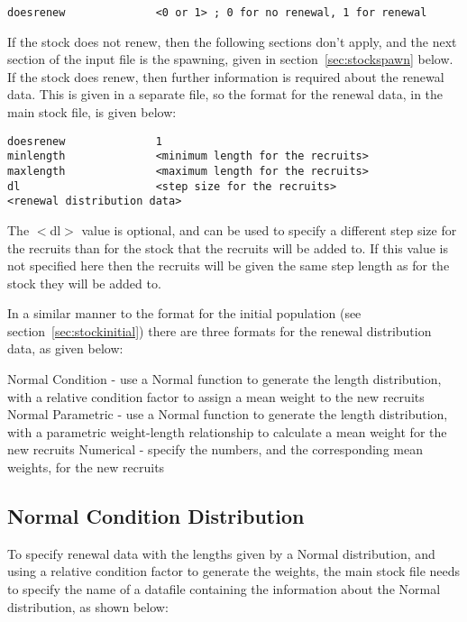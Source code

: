 \documentclass[10pt,twoside]{book}
\begin{document}
{\small\begin{verbatim}
doesrenew              <0 or 1> ; 0 for no renewal, 1 for renewal
\end{verbatim}}

If the stock does not renew, then the following sections don't apply, and the next section of the input file is the spawning, given in section~\ref{sec:stockspawn} below.  If the stock does renew, then further information is required about the renewal data.  This is given in a separate file, so the format for the renewal data, in the main stock file, is given below:

{\small\begin{verbatim}
doesrenew              1
minlength              <minimum length for the recruits>
maxlength              <maximum length for the recruits>
dl                     <step size for the recruits>
<renewal distribution data>
\end{verbatim}}

The $<$dl$>$ value is optional, and can be used to specify a different step size for the recruits than for the stock that the recruits will be added to.  If this value is not specified here then the recruits will be given the same step length as for the stock they will be added to.

\bigskip
In a similar manner to the format for the initial population (see section~\ref{sec:stockinitial}) there are three formats for the renewal distribution data, as given below:

\bigskip
Normal Condition - use a Normal function to generate the length distribution, with a relative condition factor to assign a mean weight to the new recruits\newline
Normal Parametric - use a Normal function to generate the length distribution, with a parametric weight-length relationship to calculate a mean weight for the new recruits\newline
Numerical - specify the numbers, and the corresponding mean weights, for the new recruits

\subsection{Normal Condition Distribution}
To specify renewal data with the lengths given by a Normal distribution, and using a relative condition factor to generate the weights, the main stock file needs to specify the name of a datafile containing the information about the Normal distribution, as shown below:
\end{document}
